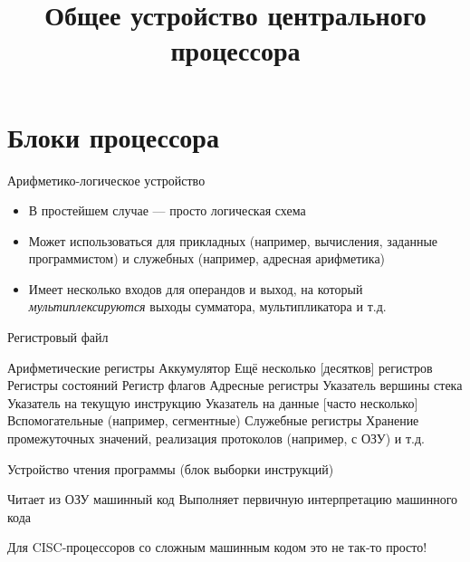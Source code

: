 \documentclass[xetex,aspectratio=43]{beamer}
\title{Общее устройство центрального процессора}
\begin{document}
    \titleslide

    \tocslide

\section{Блоки процессора}

\begin{frame}{Арифметико-логическое устройство}
    \begin{itemize}
        \item В простейшем случае --- просто логическая схема
        \item Может использоваться для прикладных (например, вычисления, заданные программистом) и служебных (например, адресная арифметика)
        \item Имеет несколько входов для операндов и выход, на который \emph{мультиплексируются} выходы сумматора, мультипликатора и т.д.
    \end{itemize}
\end{frame}

\begin{frame}{Регистровый файл}
    \begin{outline}[itemize]
        \1 Арифметические регистры
            \2 Аккумулятор
            \2 Ещё несколько [десятков] регистров
        \1 Регистры состояний
            \2 Регистр флагов
        \1 Адресные регистры
            \2 Указатель вершины стека
            \2 Указатель на текущую инструкцию
            \2 Указатель на данные [часто несколько]
            \2 Вспомогательные (например, сегментные)
        \1 Служебные регистры
            \2 Хранение промежуточных значений, реализация протоколов (например, с ОЗУ) и т.д.
    \end{outline}
\end{frame}

\begin{frame}{Устройство чтения программы (блок выборки инструкций)}
    \begin{outline}[itemize]
        \1 Читает из ОЗУ машинный код
            \2 Выполняет первичную интерпретацию машинного кода
    \end{outline}
    Для CISC-процессоров со сложным машинным кодом это не так-то просто!
\end{frame}
\end{document}
